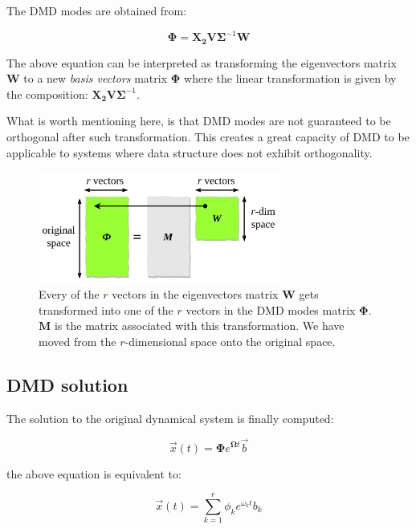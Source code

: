 \documentclass[10pt,twocolumn]{article}
\begin{document}
The DMD modes are obtained from:

\begin{equation} \label{eq:A_underline}
\bm{\Phi} = \bm{X_2} \bm{V} \bm{\Sigma}^{-1} \bm{W}
\end{equation}

The above equation can be interpreted as transforming the eigenvectors matrix $\bm{W}$ to a new \textit{basis vectors} matrix $\bm{\Phi}$ where the linear transformation is given by the composition: $\bm{X_2} \bm{V} \bm{\Sigma}^{-1}$.

What is worth mentioning here, is that DMD modes are not guaranteed to be orthogonal after such transformation. This creates a great capacity of DMD to be applicable to systems where data structure does not exhibit orthogonality.

\begin{figure}[H]
\centering\includegraphics[width=8cm]{dmd-modes-transformation.png}
\caption{Every of the $r$ vectors in the eigenvectors matrix $\bm{W}$ gets transformed into one of the $r$ vectors in the DMD modes matrix $\bm{\Phi}$. $\bm{M}$ is the matrix associated with this transformation. We have moved from the $r$-dimensional space onto the original space.}
\label{fig:linear_system}
\end{figure}

\subsection{DMD solution}

The solution to the original dynamical system is finally computed:

\begin{equation} \label{eq:x-solution-matrix}
\vec{x}(t) = \bm{\Phi} e^{\bm{\Omega} t} \vec{b}
\end{equation}

the above equation is equivalent to:

\begin{equation} \label{eq:x-solution-summation}
\vec{x}(t)  = \sum_{k=1}^{r} \phi_k e^{\omega_k t} b_k
\end{equation}
\end{document}

